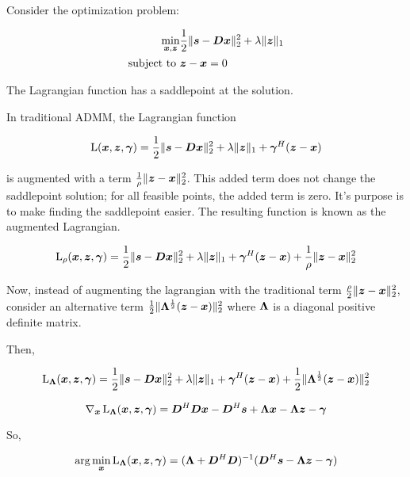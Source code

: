 \documentclass{article}
\begin{document}
Consider the optimization problem:

\begin{equation}
\begin{aligned}
\min_{\bm{x},\bm{z}} & \frac{1}{2}\|\bm{s} - \bm{D}\bm{x}\|_2^2 + \lambda\|\bm{z}\|_1 \\
\text{subject to } & \bm{z} - \bm{x} = 0
\end{aligned}
\end{equation}

The Lagrangian function has a saddlepoint at the solution.

In traditional ADMM, the Lagrangian function

\begin{equation}
\operatorname{L}(\bm{x},\bm{z},\bm{\gamma}) = \frac{1}{2}\|\bm{s} - \bm{D}\bm{x}\|_2^2 + \lambda\|\bm{z}\|_1 + \bm{\gamma}^H(\bm{z} - \bm{x})
\end{equation}

is augmented with a term $\frac{1}{\rho}\|\bm{z} - \bm{x}\|_2^2$. This added term does not change the saddlepoint solution; for all feasible points, the added term is zero. It's purpose is to make finding the saddlepoint easier. The resulting function is known as the augmented Lagrangian.

\begin{equation}
\operatorname{L}_{\rho}(\bm{x},\bm{z},\bm{\gamma}) = \frac{1}{2}\|\bm{s} - \bm{D}\bm{x}\|_2^2 + \lambda\|\bm{z}\|_1 + \bm{\gamma}^H(\bm{z} - \bm{x}) + \frac{1}{\rho}\|\bm{z} - \bm{x}\|_2^2  
\end{equation}

Now, instead of augmenting the lagrangian with the traditional term 
$\frac{\rho}{2}\|\bm{z} - \bm{x}\|_2^2$, consider an alternative term $\frac{1}{2}\|\bm{\Lambda}^{\frac{1}{2}}(\bm{z} - \bm{x})\|_2^2$ where $\bm{\Lambda}$ is a diagonal positive definite matrix.

Then,


\begin{equation}
\operatorname{L}_{\bm{\Lambda}}(\bm{x},\bm{z},\bm{\gamma}) = \frac{1}{2}\|\bm{s} - \bm{D}\bm{x}\|_2^2 + \lambda\|\bm{z}\|_1 + \bm{\gamma}^H(\bm{z} - \bm{x}) + \frac{1}{2}\|\bm{\Lambda}^{\frac{1}{2}}(\bm{z} - \bm{x})\|_2^2  
\end{equation}



\begin{equation}
\nabla_{\bm{x}} \operatorname{L}_{\bm{\Lambda}}(\bm{x},\bm{z},\bm{\gamma}) = \bm{D}^H\bm{D}\bm{x} - \bm{D}^H\bm{s} + \bm{\Lambda}\bm{x} - \bm{\Lambda}\bm{z} - \bm{\gamma}
\end{equation}

So,

\begin{equation}
\arg\min_{\bm{x}} \operatorname{L}_{\bm{\Lambda}}(\bm{x},\bm{z},\bm{\gamma}) = (\bm{\Lambda} + \bm{D}^H\bm{D})^{-1}(\bm{D}^H\bm{s} - \bm{\Lambda}\bm{z} - \bm{\gamma})
\end{equation}
\end{document}
